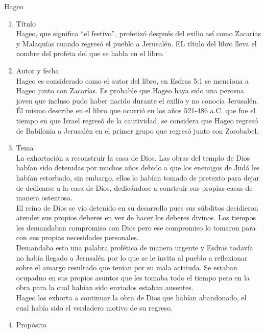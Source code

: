 %
%
\begin{section}{Hageo}
	\begin{enumerate}
		\item Título\\
			Hageo, que significa ``el festivo'', profetizó después del exilio así como Zacarías y Malaquías cuando regresó el pueblo a Jerusalén. EL título del libro lleva el nombre del profeta del que se habla en el libro. 
		\item Autor y fecha\\
			Hageo es considerado como el autor del libro, en Esdras 5:1 se menciona a Hageo junto con Zacarías. Es probable que Hageo haya sido una perosna joven que incluso pudo haber nacido durante el exilio y no conocía Jerusalén.\\
			Él mismo describe en el libro que ocurrió en los años 521-486 a.C. que fue el tiempo en que Israel regresó de la cautividad, se considera que Hageo regresó de Babilonia a Jerusalén en el primer grupo que regresó junto con Zorobabel.
		\item Tema\\
			La exhortación a reconstruir la casa de Dios. Las obras del templo de Dios habían sido detenidas por muchos años debido a que los enemigos de Judá les habían estorbado, sin embargo, ellos lo habían tomado de pretexto para dejar de dedicarse a la casa de Dios, dedicándose a construir sus propias casas de manera ostentosa.\\
			El reino de Dios se vio detenido en su desarrollo pues sus súbditos decidieron atender sus propios deberes en vez de hacer los deberes divinos. Los tiempos les demandaban compromiso con Dios pero ese compromiso lo tomaron para con sus propias necesidades personales.\\
			Demandaba esto una palabra profética de manera urgente y Esdras todavía no había llegado a Jerusalén por lo que se le invita al pueblo a reflexionar sobre el amargo resultado que tenían por su mala actituda. Se estaban ocupadno en sus propios asuntos que les tomaba todo el tiempo pero en la obra para la cual habían sido enviados estaban ausentes.\\
			Hageo los exhorta a continuar la obra de Dios que habían abandonado, el cual había sido el verdadero motivo de su regreso.
		\item Propósito\\

\end{enumerate}
\end{section}
